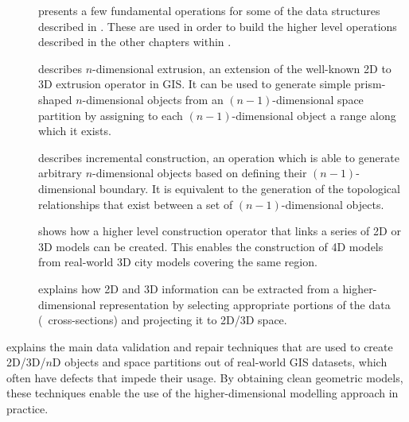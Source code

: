 \begin{description}
\begin{description}
\item[]
presents a few fundamental operations for some of the data structures described in .
These are used in order to build the higher level operations described in the other chapters within .

\item[]
describes $n$-dimensional extrusion, an extension of the well-known 2D to 3D extrusion operator in GIS.\@
It can be used to generate simple prism-shaped $n$-dimensional objects from an $(n-1)$-dimensional space partition by assigning to each $(n-1)$-dimensional object a range along which it exists.

\item[]
describes incremental construction, an operation which is able to generate arbitrary $n$-dimensional objects based on defining their $(n-1)$-dimensional boundary.
It is equivalent to the generation of the topological relationships that exist between a set of $(n-1)$-dimensional objects.

\item[]
shows how a higher level construction operator that links a series of 2D or 3D models can be created.
This enables the construction of 4D models from real-world 3D city models covering the same region.

\item[]
explains how 2D and 3D information can be extracted from a higher-dimensional representation by selecting appropriate portions of the data (\eg\ cross-sections) and projecting it to 2D/3D space.

\end{description}


\item[\refch{ch:cleaning}]
explains the main data validation and repair techniques that are used to create 2D/3D/$n$D objects and space partitions out of real-world GIS datasets, which often have defects that impede their usage.
By obtaining clean geometric models, these techniques enable the use of the higher-dimensional modelling approach in practice.



\end{description}
